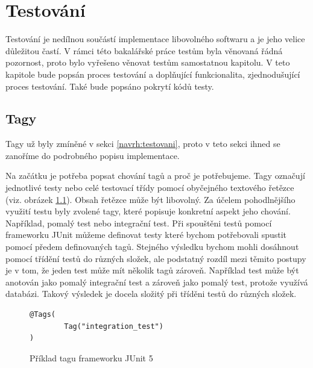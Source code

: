 \chapter{Testování}\label{testovani}
Testování je nedílnou součástí implementace libovolného softwaru a je jeho velice důležitou častí. V rámci této bakalářské práce testům byla věnovaná řádná pozornost, proto bylo vyřešeno věnovat testům samostatnou kapitolu. V teto kapitole bude popsán proces testování a doplňující funkcionalita, zjednodušující proces testování. Také bude popsáno pokrytí kódů testy.

\section{Tagy}\label{testovani:tagy}
    Tagy už byly zmíněné v sekci \ref{navrh:testovani}, proto v teto sekci ihned se zanoříme do podrobného popisu implementace. 
    
    Na začátku je potřeba popsat chování tagů a proč je potřebujeme. Tagy označují jednotlivé testy nebo celé testovací třídy pomocí obyčejného textového řetězce (viz. obrázek \ref{code:tag-junit-5}). Obsah řetězce může být libovolný. Za účelem pohodlnějšího využití testu byly zvolené tagy, které popisuje konkretní aspekt jeho chování. Například, pomalý test nebo integrační test. Při spouštěni testů pomocí frameworku JUnit můžeme definovat testy které bychom potřebovali spustit pomocí předem definovaných tagů. Stejného výsledku bychom mohli dosáhnout pomocí třídění testů do různých složek, ale podstatný rozdíl mezi těmito postupy je v tom, že jeden test může mít několik tagů zároveň. Například test může být anotován jako pomalý integrační test a zároveň jako pomalý test, protože využívá databázi. Takový výsledek je docela složitý při tříděni testů do různých složek.
    \begin{figure}
        \begin{verbatim}
@Tags(
        Tag("integration_test")
)
        \end{verbatim}
        \caption{Příklad tagu frameworku JUnit 5} 
        \label{code:tag-junit-5}
    \end{figure}
    
